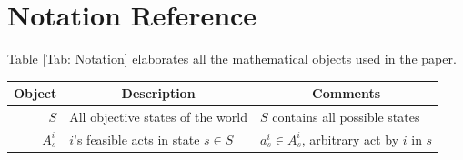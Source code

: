 \documentclass[
11pt,
titlepage,
reqno,
]{article}%
\theoremstyle{definition}
\begin{document}
\section{Notation Reference}
Table \ref{Tab: Notation} elaborates all the mathematical objects used in the paper.
\begin{table}\centering
{}
\begin{tabular}{@{}rll@{}}\toprule
Object                                             & \multicolumn{1}{c}{Description}                       & \multicolumn{1}{c}{Comments}\\ \midrule
$S$                                         & All objective states of the world       & $S$ contains all possible states\\
$A^i_s$                                           & $i$'s feasible acts in state $s\in S$               & $a^i_s\in A^i_s$,  arbitrary act by $i$ in $s$\\

\end{tabular}
\end{table}
\end{document}
